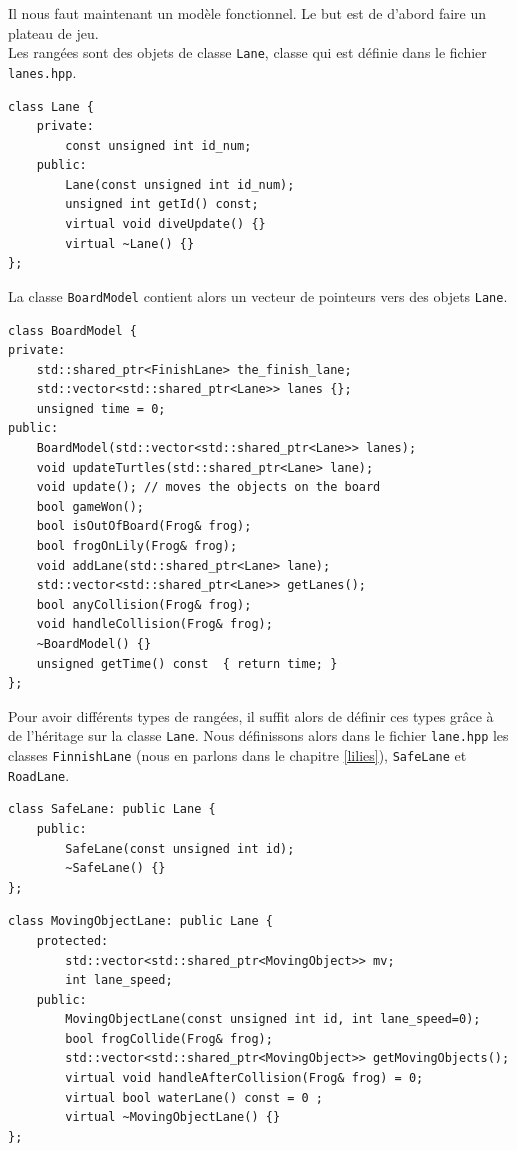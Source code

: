 \documentclass[a4paper, 12pt]{article}
\begin{document}
Il nous faut maintenant un modèle fonctionnel. Le but est de d'abord faire un plateau de jeu. \\

Les rangées sont des objets de classe \texttt{Lane}, classe qui est définie dans le fichier \texttt{lanes.hpp}.

\begin{lstlisting}
class Lane {
    private:
        const unsigned int id_num;
    public:
        Lane(const unsigned int id_num);
        unsigned int getId() const;
        virtual void diveUpdate() {}
        virtual ~Lane() {}
};  
\end{lstlisting}

La classe \texttt{BoardModel} contient alors un vecteur de pointeurs vers des objets \texttt{Lane}.

\begin{lstlisting}
class BoardModel {
private:
    std::shared_ptr<FinishLane> the_finish_lane;
    std::vector<std::shared_ptr<Lane>> lanes {};
    unsigned time = 0;
public:
    BoardModel(std::vector<std::shared_ptr<Lane>> lanes);
    void updateTurtles(std::shared_ptr<Lane> lane);
    void update(); // moves the objects on the board
    bool gameWon();
    bool isOutOfBoard(Frog& frog);
    bool frogOnLily(Frog& frog);
    void addLane(std::shared_ptr<Lane> lane);
    std::vector<std::shared_ptr<Lane>> getLanes();
    bool anyCollision(Frog& frog);
    void handleCollision(Frog& frog);
    ~BoardModel() {}
    unsigned getTime() const  { return time; }
};
\end{lstlisting}

Pour avoir différents types de rangées, il suffit alors de définir ces types grâce à de l'héritage sur la classe \texttt{Lane}. Nous définissons alors dans le fichier \texttt{lane.hpp} les classes \texttt{FinnishLane} (nous en parlons dans le chapitre \ref{lilies}), \texttt{SafeLane} et \texttt{RoadLane}. \\

\begin{lstlisting}
class SafeLane: public Lane {
    public:
        SafeLane(const unsigned int id);
        ~SafeLane() {}
};
\end{lstlisting}

\begin{lstlisting}
class MovingObjectLane: public Lane {
    protected:
        std::vector<std::shared_ptr<MovingObject>> mv;
        int lane_speed;
    public:
        MovingObjectLane(const unsigned int id, int lane_speed=0);
        bool frogCollide(Frog& frog);
        std::vector<std::shared_ptr<MovingObject>> getMovingObjects();
        virtual void handleAfterCollision(Frog& frog) = 0;
        virtual bool waterLane() const = 0 ;
        virtual ~MovingObjectLane() {}
};
\end{lstlisting}
\end{document}

